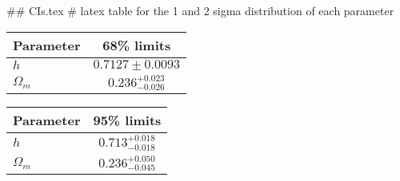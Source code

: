 ## CIs.tex
# latex table for the 1 and 2 sigma distribution of each parameter

\begin{tabular} { l  c}
 Parameter &  68\% limits\\
\hline
{\boldmath$h              $} & $0.7127\pm 0.0093          $\\
{\boldmath$\Omega_m       $} & $0.236^{+0.023}_{-0.026}   $\\
\hline
\end{tabular}

\begin{tabular} { l  c}
 Parameter &  95\% limits\\
\hline
{\boldmath$h              $} & $0.713^{+0.018}_{-0.018}   $\\
{\boldmath$\Omega_m       $} & $0.236^{+0.050}_{-0.045}   $\\
\hline
\end{tabular}
